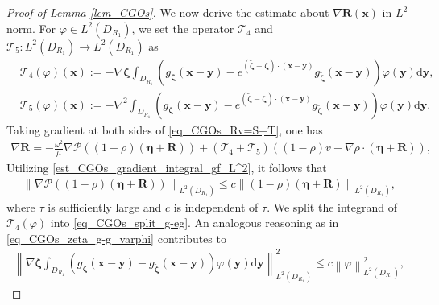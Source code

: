 \documentclass[11pt,reqno,oneside]{amsart}
\theoremstyle{definition}
\theoremstyle{remark}
\numberwithin{equation}{section}
\numberwithin{equation}{section}
\theoremstyle{remark}
\begin{document}
\begin{proof}[Proof of Lemma \ref{lem_CGOs}]
	We now derive the estimate about $ \nabla \mathbf{R}\left(\mathbf{x}\right) $ in $ L^2 $-norm. For $ \varphi \in L^2 \left(D_{R_1}\right) $, we set the operator $ \mathcal{T}_4 $ and $ \mathcal{T}_5 : L^2\left(D_{R_1}\right)\to L^2\left(D_{R_1}\right) $ as
	\begin{align*}
		&\mathcal{T}_4\left(\varphi\right)\left(\mathbf{x}\right) := - \nabla \bm{\zeta} \int_{D_{R_1}} \left(g_{\bm{\zeta}}\left(\mathbf{x} - \mathbf{y}\right) - e^{\left(\tilde{\bm{\zeta}}-\bm{\zeta}\right) \cdot \left(\mathbf{x} - \mathbf{y}\right)} g_{\tilde{\bm{\zeta}}}\left(\mathbf{x} - \mathbf{y}\right)\right) \varphi\left(\mathbf{y}\right) \mathrm{d} \mathbf{y}, \\
		&\mathcal{T}_5\left(\varphi\right)\left(\mathbf{x}\right) := - \nabla^2 \int_{D_{R_1}} \left(g_{\bm{\zeta}}\left(\mathbf{x} - \mathbf{y}\right) - e^{\left(\tilde{\bm{\zeta}}-\bm{\zeta}\right) \cdot \left(\mathbf{x} - \mathbf{y}\right)} g_{\tilde{\bm{\zeta}}}\left(\mathbf{x} - \mathbf{y}\right)\right) \varphi\left(\mathbf{y}\right) \mathrm{d} \mathbf{y}.
	\end{align*}
	Taking gradient at both sides of \eqref{eq_CGOs_Rv=S+T}, one has 
	\begin{align*}
		\nabla\mathbf{R} = -\frac{\omega^2}{\mu} \nabla\mathcal{P}\left(\left(1-\rho\right) \left(\bm{\eta}+\mathbf{R}\right)\right) + \left(\mathcal{T}_4 + \mathcal{T}_5\right) \left(\left(1-\rho\right) v - \nabla \rho \cdot \left(\bm{\eta}+\mathbf{R}\right)\right),
	\end{align*}
	Utilizing \eqref{est_CGOs_gradient_integral_gf_L^2}, it follows that 
	\begin{align*} 
		\left\| \nabla\mathcal{P}\left(\left(1-\rho\right) \left(\bm{\eta}+\mathbf{R}\right)\right) \right\|_{L^2\left(D_{R_1}\right)} \leqslant c \left\| \left(1-\rho\right) \left(\bm{\eta}+\mathbf{R}\right) \right\|_{L^2\left(D_{R_1}\right)} ,
	\end{align*}
	where $ \tau $ is sufficiently large and $ c $ is independent of $ \tau $. We split the integrand of $ \mathcal{T}_4\left(\varphi\right) $ into \eqref{eq_CGOs_split_g-eg}. An analogous reasoning as in \eqref{eq_CGOs_zeta_g-g_varphi} contributes to
	\begin{align} \label{eq_CGOs_gradzeta_g-g_varphi}
		\left\| \nabla \bm{\zeta} \int_{D_{R_1}} \left(g_{\bm{\zeta}}\left(\mathbf{x} - \mathbf{y}\right) - g_{\tilde{\bm{\zeta}}}\left(\mathbf{x} - \mathbf{y}\right)\right) \varphi \left(\mathbf{y}\right) \mathrm{d} \mathbf{y} \right\|^2_{L^2\left(D_{R_1}\right)} \leqslant c \left\| \varphi \right\|^2_{L^2\left(D_{R_1}\right)},

\end{align}
\end{proof}
\end{document}
